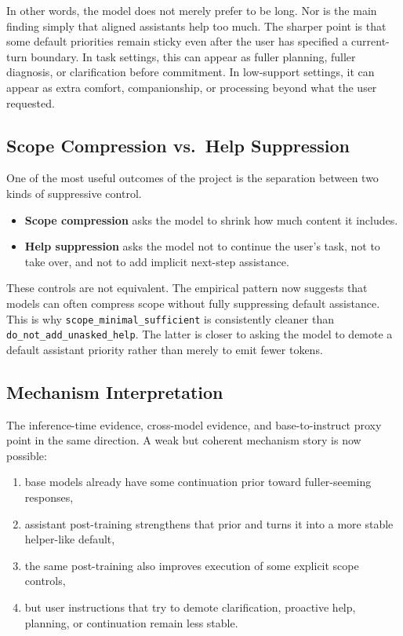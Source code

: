 \documentclass[11pt]{article}
\begin{document}
In other words, the model does not merely prefer to be long. Nor is the main finding simply that aligned assistants help too much. The sharper point is that some default priorities remain sticky even after the user has specified a current-turn boundary. In task settings, this can appear as fuller planning, fuller diagnosis, or clarification before commitment. In low-support settings, it can appear as extra comfort, companionship, or processing beyond what the user requested.

\subsection{Scope Compression vs.\ Help Suppression}
One of the most useful outcomes of the project is the separation between two kinds of suppressive control.

\begin{itemize}[leftmargin=1.5em]
  \item \textbf{Scope compression} asks the model to shrink how much content it includes.
  \item \textbf{Help suppression} asks the model not to continue the user's task, not to take over, and not to add implicit next-step assistance.
\end{itemize}

These controls are not equivalent. The empirical pattern now suggests that models can often compress scope without fully suppressing default assistance. This is why \texttt{scope\_minimal\_sufficient} is consistently cleaner than \texttt{do\_not\_add\_unasked\_help}. The latter is closer to asking the model to demote a default assistant priority rather than merely to emit fewer tokens.

\subsection{Mechanism Interpretation}
The inference-time evidence, cross-model evidence, and base-to-instruct proxy point in the same direction. A weak but coherent mechanism story is now possible:
\begin{enumerate}[leftmargin=1.5em]
  \item base models already have some continuation prior toward fuller-seeming responses,
  \item assistant post-training strengthens that prior and turns it into a more stable helper-like default,
  \item the same post-training also improves execution of some explicit scope controls,
  \item but user instructions that try to demote clarification, proactive help, planning, or continuation remain less stable.
\end{enumerate}
\end{document}
